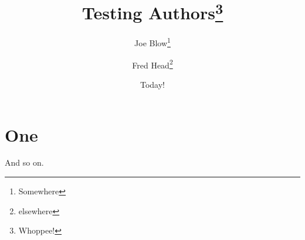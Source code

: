 \documentclass{article}
\title{Testing Authors\thanks{Whoppee!}}
\author{Joe Blow\thanks{Somewhere}\and Fred Head\thanks{elsewhere}}
\date{Today!}
\begin{document}
\maketitle
\section{One}\label{sec:one}
And so on.
\end{document}
